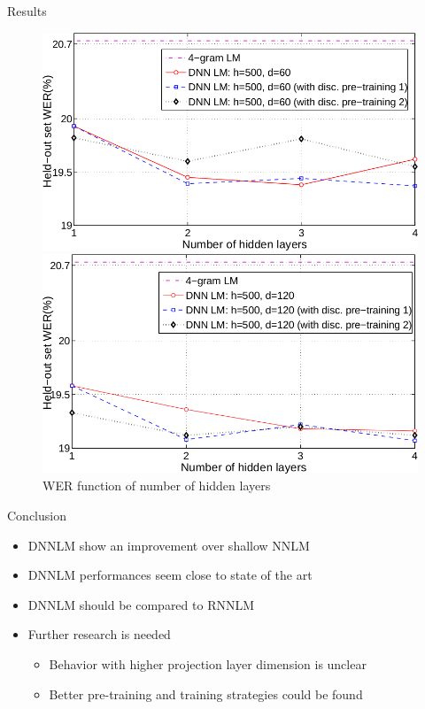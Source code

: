 \documentclass{beamer}
\begin{document}
\begin{frame}{Results}
	\begin{figure}[!htb]
		\centering
			\begin{minipage}{0.45\textwidth}
				    \includegraphics[width=\linewidth]{./images/results4.png}
			\end{minipage}
			\hspace{5mm}
			\begin{minipage}{0.45\textwidth}
				    \includegraphics[width=\linewidth]{./images/results5.png}
			\end{minipage}
		\caption{WER function of number of hidden layers}
	\end{figure}
\end{frame}

\begin{frame}{Conclusion}
	\begin{itemize}
		\item DNNLM show an improvement over shallow NNLM
		\item DNNLM performances seem close to state of the art
		\item DNNLM should be compared to RNNLM
		\item Further research is needed
		\begin{itemize}
			\item Behavior with higher projection layer dimension is unclear
			\item Better pre-training and training strategies could be found
		\end{itemize}
	\end{itemize}
\end{frame}
\end{document}
